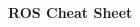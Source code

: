 \documentclass[10pt,landscape]{article}
\makeatletter
\renewcommand{\section}{\@startsection{section}{1}{0mm}%
                                {-0mm} %
                                {0.5mm}%
                                {\normalfont\large\bfseries}}
\makeatother
\begin{document}
\raggedright
\footnotesize
\begin{multicols}{3}


\setlength{\premulticols}{1pt}
\setlength{\postmulticols}{1pt}
\setlength{\multicolsep}{1pt}
\setlength{\columnsep}{2pt}

\begin{center}
     \Large{\textbf{ROS Cheat Sheet}} \\
\end{center}
\newlength{\MyLen}



\end{multicols}
\end{document}
